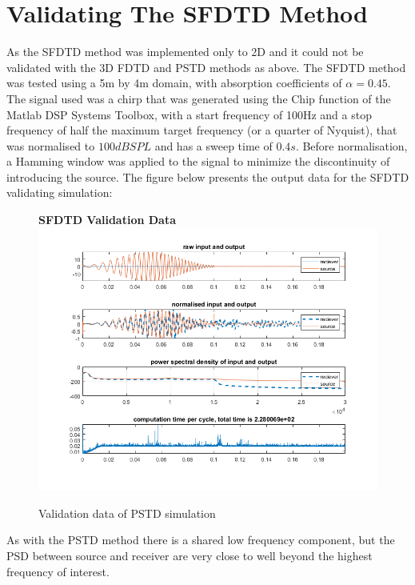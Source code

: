 \section{Validating The SFDTD Method}
As the SFDTD method was implemented only to 2D and it could not be validated with the 3D FDTD and PSTD methods as above. The SFDTD method was tested using a 5m by 4m domain, with absorption coefficients of $ \alpha = 0.45$. The signal used was a chirp that was generated using the Chip function of the Matlab DSP Systems Toolbox, with a start frequency of 100Hz and a stop frequency of half the maximum target frequency (or a quarter of Nyquist), that was normalised to $100dBSPL$ and has a sweep time of $0.4s$. Before normalisation, a Hamming window was applied to the signal to minimize the discontinuity of introducing the source. The figure below presents the output data for the SFDTD validating simulation:\\

\begin{figure}[H]
\centering
\textbf{SFDTD Validation Data}
  \includegraphics[width=\textwidth]{./graphics/SFDTDvalidationFinal.png}
  \caption{Validation data of PSTD simulation}
\end{figure}
As with the PSTD method there is a shared low frequency component, but the PSD between source and receiver are very close to well beyond the highest frequency of interest.